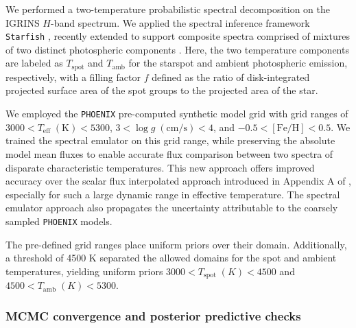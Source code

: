 \documentclass[trackchanges]{aastex631}
\begin{document}
We performed a two-temperature probabilistic spectral decomposition on the IGRINS $H$-band spectrum.  We applied the spectral inference framework \texttt{Starfish} \citep{czekala15}, recently extended to support composite spectra comprised of mixtures of two distinct photospheric components \citep{gullysantiago17}.  Here, the two temperature components are labeled as $T_{\mathrm{spot}}$ and $T_{\mathrm{amb}}$ for the starspot and ambient photospheric emission, respectively, with a filling factor $f$ defined as the ratio of disk-integrated projected surface area of the spot groups to the projected area of the star.

We employed the \texttt{PHOENIX} pre-computed synthetic model grid \citep{husser13} with grid ranges of $3000 < T_{\mathrm{eff}} \; (\textrm{K}) < 5300 $, $3 < \log{g \;(\textrm{cm/s})}  < 4 $, and $ -0.5 <  [\mathrm{Fe}/\mathrm{H}] <0.5$.  We trained the spectral emulator \citep{czekala15} on this grid range, while preserving the absolute model mean fluxes to enable accurate flux comparison between two spectra of disparate characteristic temperatures.  This new approach offers improved accuracy over the scalar flux interpolated approach introduced in Appendix A of \citet{gullysantiago17}, especially for such a large dynamic range in effective temperature.  The spectral emulator approach also propagates the uncertainty attributable to the coarsely sampled \texttt{PHOENIX} models.

The pre-defined grid ranges place uniform priors over their domain.  Additionally, a threshold of 4500 K separated the allowed domains for the spot and ambient temperatures, yielding uniform priors $3000 < T_{\mathrm{spot}} \; (K) < 4500 $ and $4500 < T_{\mathrm{amb}} \; (K) < 5300$.

\subsubsection{MCMC convergence and posterior predictive checks}
\end{document}
